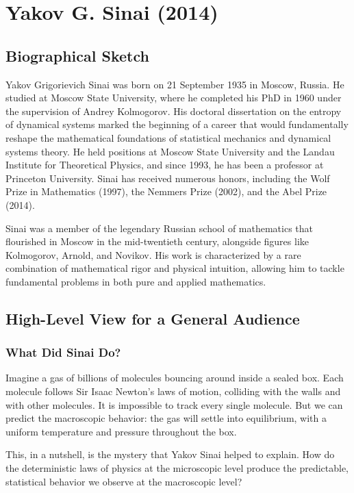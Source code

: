 \chapter{Yakov G. Sinai (2014)}

\section{Biographical Sketch}

Yakov Grigorievich Sinai was born on 21 September 1935 in Moscow, Russia. He studied at Moscow State University, where he completed his PhD in 1960 under the supervision of Andrey Kolmogorov. His doctoral dissertation on the entropy of dynamical systems marked the beginning of a career that would fundamentally reshape the mathematical foundations of statistical mechanics and dynamical systems theory. He held positions at Moscow State University and the Landau Institute for Theoretical Physics, and since 1993, he has been a professor at Princeton University. Sinai has received numerous honors, including the Wolf Prize in Mathematics (1997), the Nemmers Prize (2002), and the Abel Prize (2014).

Sinai was a member of the legendary Russian school of mathematics that flourished in Moscow in the mid-twentieth century, alongside figures like Kolmogorov, Arnold, and Novikov. His work is characterized by a rare combination of mathematical rigor and physical intuition, allowing him to tackle fundamental problems in both pure and applied mathematics.

\section{High-Level View for a General Audience}

\subsection{What Did Sinai Do?}

Imagine a gas of billions of molecules bouncing around inside a sealed box. Each molecule follows Sir Isaac Newton's laws of motion, colliding with the walls and with other molecules. It is impossible to track every single molecule. But we can predict the macroscopic behavior: the gas will settle into equilibrium, with a uniform temperature and pressure throughout the box.

This, in a nutshell, is the mystery that Yakov Sinai helped to explain. How do the deterministic laws of physics at the microscopic level produce the predictable, statistical behavior we observe at the macroscopic level?

